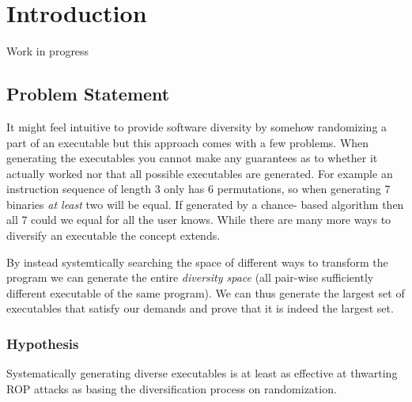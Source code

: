 \chapter{Introduction}

Work in progress

\section{Problem Statement}

It might feel intuitive to provide software diversity by somehow randomizing a part of an
executable but this approach comes with a few problems. When generating the executables
you cannot make any guarantees as to whether it actually worked nor that all possible executables
are generated. For example an instruction sequence of length 3 only has 6 permutations, so
when generating 7 binaries \textit{at least} two will be equal. If generated by a chance-
based algorithm then all 7 could we equal for all the user knows. While there are many
more ways to diversify an executable the concept extends.

By instead systemtically searching the space of different ways to transform the program
we can generate the entire \textit{diversity space} (all pair-wise sufficiently different
executable of the same program). We can thus generate the largest set of executables that
satisfy our demands and prove that it is indeed the largest set.

\subsection{Hypothesis}

Systematically generating diverse executables is at least as effective at thwarting ROP
attacks as basing the diversification process on randomization.
